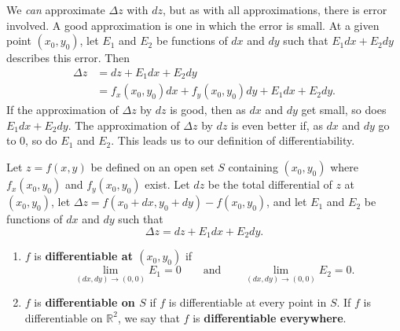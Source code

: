 We \emph{can} approximate $\Delta z$ with $dz$, but as with all approximations, there is error involved. A good approximation is one in which the error is small. At a given point $(x_0,y_0)$, let $E_1$ and $E_2$ be functions of $dx$ and $dy$ such that $E_1dx+E_2dy$ describes this error. Then
\begin{align*}
\Delta z &= dz + E_1dx+ E_2dy \\
		&= f_x(x_0,y_0)dx+f_y(x_0,y_0)dy + E_1dx+E_2dy.
\end{align*}
If the approximation of $\Delta z$ by $dz$ is good, then as $dx$ and $dy$ get small,  so does $E_1dx+E_2dy$. The approximation of $\Delta z$ by $dz$ is even better if, as $dx$ and $dy$ go to 0, so do $E_1$ and $E_2$. This leads us to our definition of differentiability.

\begin{definition}\label{def:multi_differentiability}
Let $z=f(x,y)$ be defined on an open set $S$ containing $(x_0,y_0)$ where $f_x(x_0,y_0)$ and $f_y(x_0,y_0)$ exist. Let $dz$ be the total differential of $z$ at $(x_0,y_0)$, let $\Delta z = f(x_0+dx,y_0+dy) - f(x_0,y_0)$, and let $E_1$ and $E_2$ be functions of $dx$ and $dy$  such that 
\[\Delta z = dz + E_1dx + E_2dy.\]
\begin{enumerate}
	\item $f$ is \textbf{differentiable at $(x_0,y_0)$} if%
	\[\lim_{(dx,dy)\to(0,0)}E_1=0\qquad\text{and}\qquad\lim_{(dx,dy)\to(0,0)}E_2=0.\]
	\item $f$ is \textbf{differentiable on $S$} if $f$ is differentiable at every point in $S$. If $f$ is differentiable on $\mathbb{R}^2$, we say that $f$ is \textbf{differentiable everywhere}.
\end{enumerate}
\end{definition}

